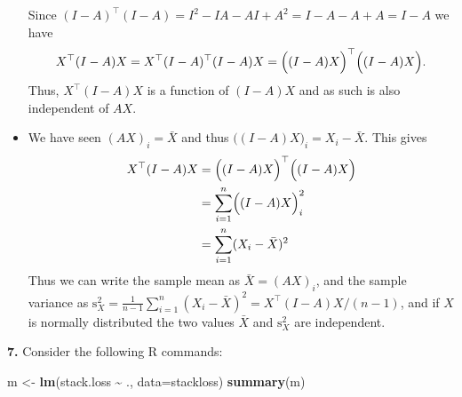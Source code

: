 \documentclass[
  a4paper,
]{article}
\newenvironment{Shaded}{\begin{snugshade}}{\end{snugshade}}
\newcommand{\AttributeTok}[1]{\textcolor[rgb]{0.13,0.29,0.53}{#1}}
\newcommand{\FunctionTok}[1]{\textcolor[rgb]{0.13,0.29,0.53}{\textbf{#1}}}
\newcommand{\NormalTok}[1]{#1}
\newcommand{\OtherTok}[1]{\textcolor[rgb]{0.56,0.35,0.01}{#1}}
\newcommand{\SpecialCharTok}[1]{\textcolor[rgb]{0.81,0.36,0.00}{\textbf{#1}}}
\theoremstyle{definition}
\theoremstyle{definition}
\theoremstyle{definition}
\theoremstyle{definition}
\theoremstyle{remark}
\begin{document}
\begin{myanswers}
\begin{itemize}
  Since
  \((I - A)^\top (I - A) = I^2 - I A - A I + A^2 = I - A
  - A + A = I - A\) we have
  \begin{equation*}
    X^\top (I-A)X
    = X^\top (I - A)^\top (I-A)X
    = \Bigl( (I-A)X \Bigr)^\top \Bigl( (I-A)X \Bigr).
  \end{equation*}
  Thus, \(X^\top (I-A)X\) is a function of \((I-A)X\) and as such is
  also independent of \(AX\).
\item
  We have seen \((AX)_i = \bar X\) and thus
  \(\bigl((I - A)X\bigr)_i = X_i - \bar X\). This gives
  \begin{align*}
    X^\top (I-A)X
    &= \Bigl( (I-A)X \Bigr)^\top \Bigl( (I-A)X \Bigr) \\
    &= \sum_{i=1}^n \Bigl( (I-A)X \Bigr)_i^2 \\
    &= \sum_{i=1}^n (X_i - \bar X)^2
  \end{align*}
  Thus we can write the sample mean as \(\bar X = (AX)_i\), and the
  sample variance as
  \(\mathrm{s}_X^2 = \frac{1}{n-1} \sum_{i=1}^n (X_i - \bar X)^2 =
  X^\top (I-A)X / (n-1)\), and if \(X\) is normally distributed the
  two values \(\bar X\) and \(\mathrm{s}_X^2\) are independent.
\end{itemize}

\end{myanswers}

\textbf{7.} Consider the following R commands:

\begin{Shaded}
\begin{Highlighting}[]
\NormalTok{m }\OtherTok{\textless{}{-}} \FunctionTok{lm}\NormalTok{(stack.loss }\SpecialCharTok{\textasciitilde{}}\NormalTok{ ., }\AttributeTok{data=}\NormalTok{stackloss)}
\FunctionTok{summary}\NormalTok{(m)}
\end{Highlighting}
\end{Shaded}
\end{document}
